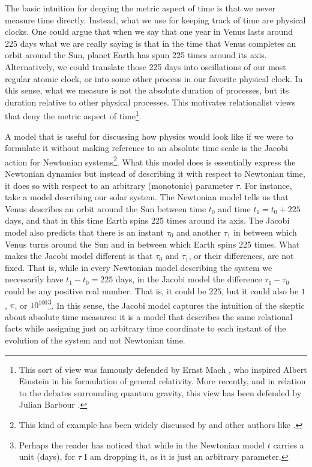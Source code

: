 \documentclass[12 pt]{article}
\begin{document}
The basic intuition for denying the metric aspect of time is that we never measure time directly. Instead, what we use for keeping track of time are physical clocks. One could argue that when we say that one year in Venus lasts around 225 days what we are really saying is that in the time that Venus completes an orbit around the Sun, planet Earth has spun 225 times around its axis. Alternatively, we could translate those 225 days into oscillations of our most regular atomic clock, or into some other process in our favorite physical clock. In this sense, what we measure is not the absolute duration of processes, but its duration relative to other physical processes. This motivates relationalist views that deny the metric aspect of time\footnote{This sort of view was famously defended by Ernst Mach \citep{Mach1883}, who inspired Albert Einstein in his formulation of general relativity. More recently, and in relation to the debates surrounding quantum gravity, this view has been defended by Julian Barbour \citep{Barbour1994}.}.

A model that is useful for discussing how physics would look like if we were to formulate it without making reference to an absolute time scale is the Jacobi action for Newtonian systems\footnote{This kind of example has been widely discussed by \cite{Barbour1994} and other authors like \cite{Gryb2010}.}. What this model does is essentially express the Newtonian dynamics but instead of describing it with respect to Newtonian time, it does so with respect to an arbitrary (monotonic) parameter $\tau$. For instance, take a model describing our solar system. The Newtonian model tells us that Venus describes an orbit around the Sun between time $t_0$ and time $t_1=t_0+225$ days, and that in this time Earth spins 225 times around its axis. The Jacobi model also predicts that there is an instant $\tau_0$ and another $\tau_1$ in between which Venus turns around the Sun and in between which Earth spins 225 times. What makes the Jacobi model different is that $\tau_0$ and $\tau_1$, or their differences, are not fixed. That is, while in every Newtonian model describing the system we necessarily have $t_1-t_0=225$ days, in the Jacobi model the difference $\tau_1-\tau_0$ could be any positive real number. That is, it could be $225$, but it could also be $1$, $\pi$, or $10^{100}$\footnote{Perhaps the reader has noticed that while in the Newtonian model $t$ carries a unit (days), for $\tau$ I am dropping it, as it is just an arbitrary parameter.}. In this sense, the Jacobi model captures the intuition of the skeptic about absolute time measures: it is a model that describes the same relational facts while assigning just an arbitrary time coordinate to each instant of the evolution of the system and not Newtonian time.
\end{document}
